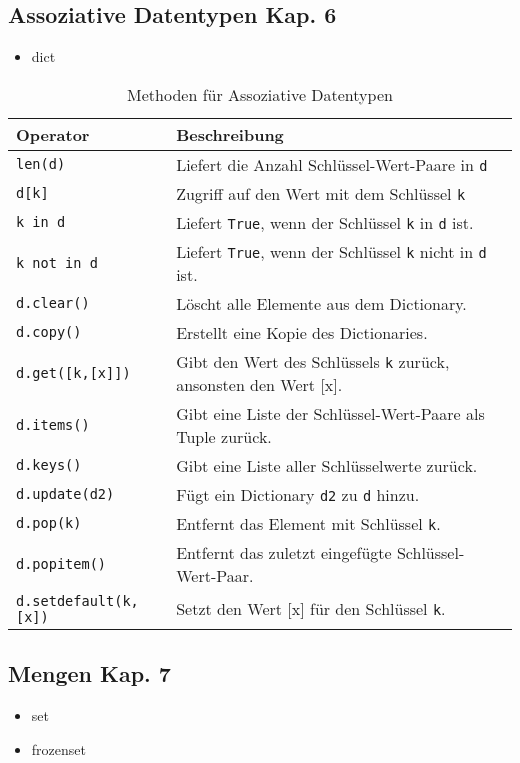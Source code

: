 \subsection[Assoziative Datentypen]{Assoziative Datentypen \tiny{Kap. 6}}
\begin{itemize}
	\item dict
\end{itemize}
\begin{table}[H]
\begin{threeparttable}
\caption{Methoden für Assoziative Datentypen}
\begin{tabular}{|l|l|}
	\hline 
	\textbf{Operator} &\textbf{Beschreibung}\\ 
	\hline 
	\texttt{len(d)} &Liefert die Anzahl Schlüssel-Wert-Paare in \texttt{d}\\
	\texttt{d[k]} &Zugriff auf den Wert mit dem Schlüssel \texttt{k}\\
	\texttt{k in d} &Liefert \texttt{True}, wenn der Schlüssel \texttt{k} in \texttt{d} ist.\\
	\texttt{k not in d} &Liefert \texttt{True}, wenn der Schlüssel \texttt{k} nicht in \texttt{d} ist.\\
	\texttt{d.clear()} &Löscht alle Elemente aus dem Dictionary.\\
	\texttt{d.copy()} &Erstellt eine Kopie des Dictionaries.\\
	\texttt{d.get([k,[x]])} &Gibt den Wert des Schlüssels \texttt{k} zurück, ansonsten den Wert [x].\\
	\texttt{d.items()} &Gibt eine Liste der Schlüssel-Wert-Paare als Tuple zurück.\\
	\texttt{d.keys()} &Gibt eine Liste aller Schlüsselwerte zurück.\\
	\texttt{d.update(d2)} &Fügt ein Dictionary \texttt{d2} zu \texttt{d} hinzu.\\
	\texttt{d.pop(k)} &Entfernt das Element mit Schlüssel \texttt{k}.\\
	\texttt{d.popitem()} &Entfernt das zuletzt eingefügte Schlüssel-Wert-Paar.\\
	\texttt{d.setdefault(k,[x])} &Setzt den Wert [x] für den Schlüssel \texttt{k}.\\
	\hline 
\end{tabular}
\end{threeparttable}
\end{table}

\subsection[Mengen]{Mengen \tiny{Kap. 7}}
\begin{itemize}
	\item set
	\item frozenset
\end{itemize}

